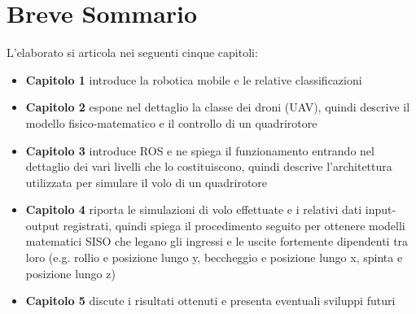 \section*{Breve Sommario}
L'elaborato si articola nei seguenti cinque capitoli:
\begin{itemize}
	\item \textbf{Capitolo 1} introduce la robotica mobile e le relative classificazioni
	\item \textbf{Capitolo 2} espone nel dettaglio la classe dei droni (\acs{UAV}), quindi descrive il modello fisico-matematico e il controllo di un quadrirotore 
	\item \textbf{Capitolo 3} introduce \acs{ROS} e ne spiega il funzionamento entrando nel dettaglio dei vari livelli che lo costituiscono, quindi descrive l'architettura utilizzata per simulare il volo di un quadrirotore
	\item \textbf{Capitolo 4} riporta le simulazioni di volo effettuate e i relativi dati input-output registrati, quindi spiega il procedimento seguito per ottenere modelli matematici \acs{SISO} che legano gli ingressi e le uscite fortemente dipendenti tra loro (e.g. rollio e posizione lungo y, beccheggio e posizione lungo x, spinta e posizione lungo z)
	\item \textbf{Capitolo 5} discute i risultati ottenuti e presenta eventuali sviluppi futuri
\end{itemize}
